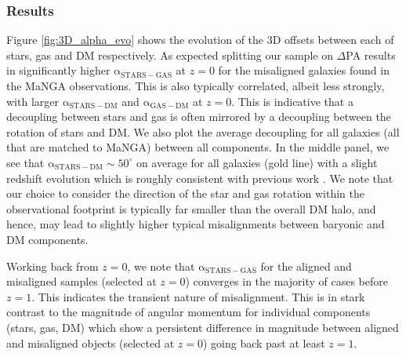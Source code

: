 \subsubsection{Results}
Figure \ref{fig:3D_alpha_evo} shows the evolution of the 3D offsets between each of stars, gas and DM respectively. As expected splitting our sample on $\Delta$PA results in significantly higher $\mathrm{\alpha_{STARS - GAS}}$ at $z = 0$ for the misaligned galaxies found in the MaNGA observations. This is also typically correlated, albeit less strongly, with larger $\mathrm{\alpha_{STARS - DM}}$ and $\mathrm{\alpha_{GAS - DM}}$ at $z=0$. This is indicative that a decoupling between stars and gas is often mirrored by a decoupling between the rotation of stars and DM. We also plot the average decoupling for all galaxies (all that are matched to MaNGA) between all components. In the middle panel, we see that $\mathrm{\alpha_{STARS - DM} \sim 50^{\circ}}$ on average for all galaxies (gold line) with a slight redshift evolution which is roughly consistent with previous work \citep[e.g.][]{chisari+17}. We note that our choice to consider the direction of the star and gas rotation within the observational footprint is typically far smaller than the overall DM halo, and hence, may lead to slightly higher typical misalignments between baryonic and DM components.

Working back from $z=0$, we note that $\mathrm{\alpha_{STARS - GAS}}$ for the aligned and misaligned samples (selected at $z=0$) converges in the majority of cases before $z=1$. This indicates the transient nature of misalignment. This is in stark contrast to the magnitude of angular momentum for individual components (stars, gas, DM) which show a persistent difference in magnitude between aligned and misaligned objects (selected at $z=0$) going back past at least $z=1$. 

